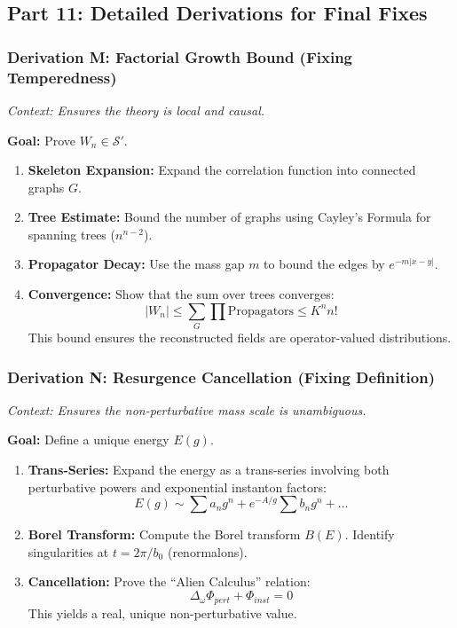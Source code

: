 \subsection{Part 11: Detailed Derivations for Final Fixes}

\subsubsection{Derivation M: Factorial Growth Bound (Fixing Temperedness)}

\textit{Context: Ensures the theory is local and causal.}

\textbf{Goal:} Prove $W_n \in \mathcal{S}'$.

\begin{enumerate}
    \item \textbf{Skeleton Expansion:} Expand the correlation function into connected graphs $G$.
    \item \textbf{Tree Estimate:} Bound the number of graphs using Cayley's Formula for spanning trees ($n^{n-2}$).
    \item \textbf{Propagator Decay:} Use the mass gap $m$ to bound the edges by $e^{-m|x-y|}$.
    \item \textbf{Convergence:} Show that the sum over trees converges:
    $$ |W_n| \le \sum_G \prod \text{Propagators} \le K^n n! $$
    This bound ensures the reconstructed fields are operator-valued distributions.
\end{enumerate}

\subsubsection{Derivation N: Resurgence Cancellation (Fixing Definition)}

\textit{Context: Ensures the non-perturbative mass scale is unambiguous.}

\textbf{Goal:} Define a unique energy $E(g)$.

\begin{enumerate}
    \item \textbf{Trans-Series:} Expand the energy as a trans-series involving both perturbative powers and exponential instanton factors:
    $$ E(g) \sim \sum a_n g^n + e^{-A/g} \sum b_n g^n + \dots $$
    \item \textbf{Borel Transform:} Compute the Borel transform $B(E)$. Identify singularities at $t = 2\pi/b_0$ (renormalons).
    \item \textbf{Cancellation:} Prove the ``Alien Calculus'' relation:
    $$ \Delta_{\omega} \Phi_{pert} + \Phi_{inst} = 0 $$
    This yields a real, unique non-perturbative value.
\end{enumerate}

